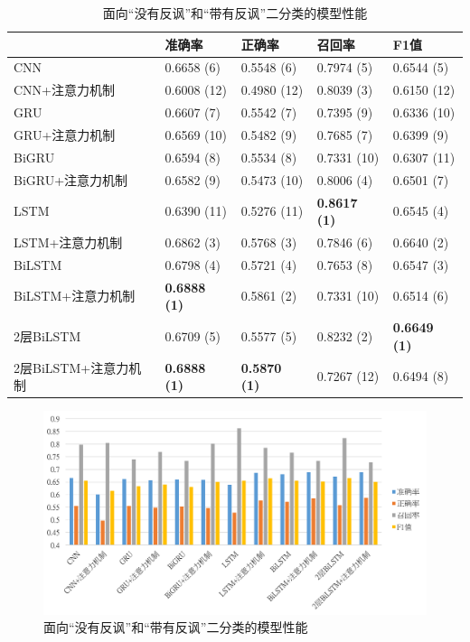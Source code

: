\begin{table}[htb]
  \centering
  \begin{minipage}[t]{\linewidth}
  \caption{面向“没有反讽”和“带有反讽”二分类的模型性能}
  \label{tab:exp_irony_det_A_single_result}
    \begin{tabularx}{\linewidth}{X|llll}
    \toprule[1.5pt]
    & 准确率 & 正确率 & 召回率 & F1值 \\
    \hline
    CNN & 0.6658 (6) & 0.5548 (6) & 0.7974 (5) & 0.6544 (5) \\ %
    CNN+注意力机制 & 0.6008 (12) & 0.4980 (12) & 0.8039 (3) & 0.6150 (12) \\  %
    \hline
    GRU & 0.6607 (7) & 0.5542 (7) & 0.7395 (9) & 0.6336 (10) \\ %
    GRU+注意力机制 & 0.6569 (10) & 0.5482 (9) & 0.7685 (7) & 0.6399 (9) \\ %
    \hline
    BiGRU & 0.6594 (8) & 0.5534 (8) & 0.7331 (10) & 0.6307 (11) \\ %
    BiGRU+注意力机制 & 0.6582 (9) & 0.5473 (10) & 0.8006 (4) & 0.6501 (7) \\ %
    \hline
    LSTM & 0.6390 (11) & 0.5276 (11) & \bf 0.8617 (1) & 0.6545 (4) \\ %
    LSTM+注意力机制 & 0.6862 (3) & 0.5768 (3) & 0.7846 (6) & 0.6640 (2) \\ %
    \hline
    BiLSTM & 0.6798 (4) & 0.5721 (4) & 0.7653 (8) & 0.6547 (3) \\ %
    BiLSTM+注意力机制 & \bf 0.6888 (1) & 0.5861 (2) & 0.7331 (10) & 0.6514 (6) \\ %
    \hline
    2层BiLSTM & 0.6709 (5) & 0.5577 (5) & 0.8232 (2) & \bf 0.6649 (1) \\ %
    2层BiLSTM+注意力机制 & \bf 0.6888 (1) & \bf 0.5870 (1) & 0.7267 (12) & 0.6494 (8) \\ %
    \bottomrule[1.5pt]
    \end{tabularx}
  \end{minipage}
\end{table}

\begin{figure}[H]
  \centering
  \includegraphics[width=\textwidth]{img/exp_irony_det_A_single_result_bar.png}
  \caption{面向“没有反讽”和“带有反讽”二分类的模型性能}
  \label{fig:exp_irony_det_A_single_result_bar}
\end{figure}

